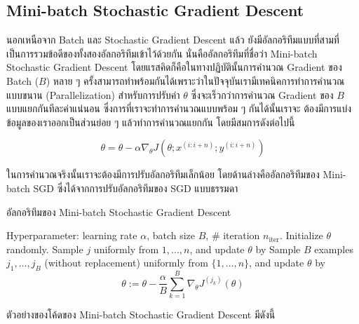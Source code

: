 \subsection{Mini-batch Stochastic Gradient Descent}
\label{ssec:minibatch_grad}

นอกเหนือจาก Batch และ Stochastic Gradient Descent แล้ว ยังมีอัลกอริทึมแบบที่สามที่เป็นการรวมข้อดีของทั้งสองอัลกอริทึมเข้าไว้ด้วยกัน
นั่นคืออัลกอริทึมที่ชื่อว่า Mini-batch Stochastic Gradient Descent โดยแรสคิดก็คือในทางปฏิบัตินั้นการคำนวณ Gradient ของ Batch 
($B$) หลาย ๆ ครั้งสามารถทำพร้อมกันได้เพราะว่าในปัจจุบันเรามีเทคนิคการทำการคำนวณแบบขนาน (Parallelization) สำหรับการปรับค่า 
$\theta$ ซึ่งจะเร็วกว่าการคำนวณ Gradient ของ $B$ แบบแยกกันทีละค่าแน่นอน ซึ่งการที่เราจะทำการคำนวณแบบพร้อม ๆ กันได้นั้นเราจะ%
ต้องมีการแบ่งข้อมูลของเราออกเป็นส่วนย่อย ๆ แล้วทำการคำนวณแยกกัน โดยมีสมการดังต่อไปนี้ 

\begin{equation}\label{eq:minibatch}
    \theta = \theta - \alpha\nabla_\theta J( \theta; x^{(i:i+n)}; y^{(i:i+n)})
\end{equation}

ในการคำนวณจริงนั้นเราจะต้องมีการปรับอัลกอริทึมเล็กน้อย โดยด้านล่างคืออัลกอริทึมของ Mini-batch SGD ซึ่งได้จากการปรับอัลกอริทึมของ SGD 
แบบธรรมดา

\begin{algorithm}[ht]
    \caption{อัลกอริทึมของ Mini-batch Stochastic Gradient Descent}
    \label{alg:minibatch}
    \begin{algorithmic}
    \State Hyperparameter: learning rate $\alpha$, batch size $B$, \# iteration $n_\text{iter}$.
    \State Initialize $\theta$ randomly.
        \State Sample $j$ uniformly from ${1,\ldots,n}$, and update $\theta$ by
        \State Sample $B$ examples $j_1,\ldots,j_B$ (without replacement) uniformly from $\{1,\ldots,n\}$, 
        and update $\theta$ by
        \begin{equation*}
            \theta := \theta - \frac{\alpha}{B}\sum_{k=1}^B\nabla_\theta J^{(j_k)}(\theta)
        \end{equation*}
    \EndFor
    \end{algorithmic}
\end{algorithm}

\noindent ตัวอย่างของโค้ดของ Mini-batch Stochastic Gradient Descent มีดังนี้

